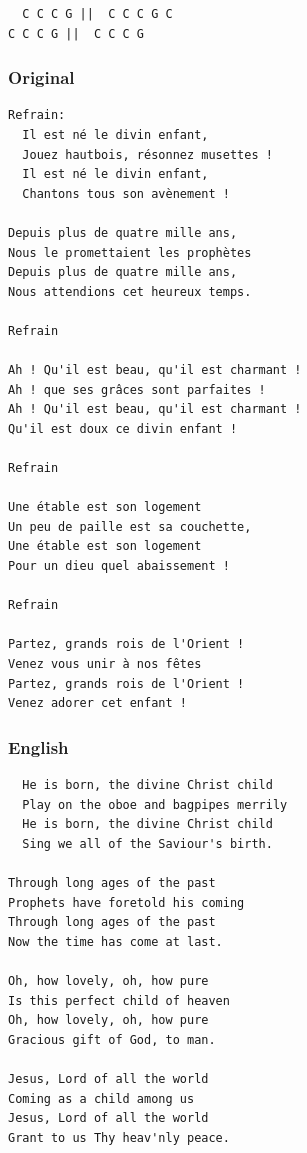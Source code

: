 \documentclass[
]{article}
\begin{document}
\begin{verbatim}
  C C C G ||  C C C G C
C C C G ||  C C C G 
\end{verbatim}

\hypertarget{original-5}{%
\subsubsection{Original}\label{original-5}}

\begin{verbatim}
Refrain:
  Il est né le divin enfant, 
  Jouez hautbois, résonnez musettes ! 
  Il est né le divin enfant, 
  Chantons tous son avènement ! 

Depuis plus de quatre mille ans, 
Nous le promettaient les prophètes 
Depuis plus de quatre mille ans, 
Nous attendions cet heureux temps. 

Refrain

Ah ! Qu'il est beau, qu'il est charmant ! 
Ah ! que ses grâces sont parfaites ! 
Ah ! Qu'il est beau, qu'il est charmant ! 
Qu'il est doux ce divin enfant ! 

Refrain

Une étable est son logement 
Un peu de paille est sa couchette, 
Une étable est son logement 
Pour un dieu quel abaissement ! 

Refrain

Partez, grands rois de l'Orient ! 
Venez vous unir à nos fêtes 
Partez, grands rois de l'Orient ! 
Venez adorer cet enfant ! 
\end{verbatim}

\hypertarget{english-6}{%
\subsubsection{English}\label{english-6}}

\begin{verbatim}
  He is born, the divine Christ child 
  Play on the oboe and bagpipes merrily 
  He is born, the divine Christ child 
  Sing we all of the Saviour's birth.

Through long ages of the past 
Prophets have foretold his coming 
Through long ages of the past 
Now the time has come at last.

Oh, how lovely, oh, how pure 
Is this perfect child of heaven 
Oh, how lovely, oh, how pure 
Gracious gift of God, to man.

Jesus, Lord of all the world 
Coming as a child among us 
Jesus, Lord of all the world 
Grant to us Thy heav'nly peace.
\end{verbatim}
\end{document}
